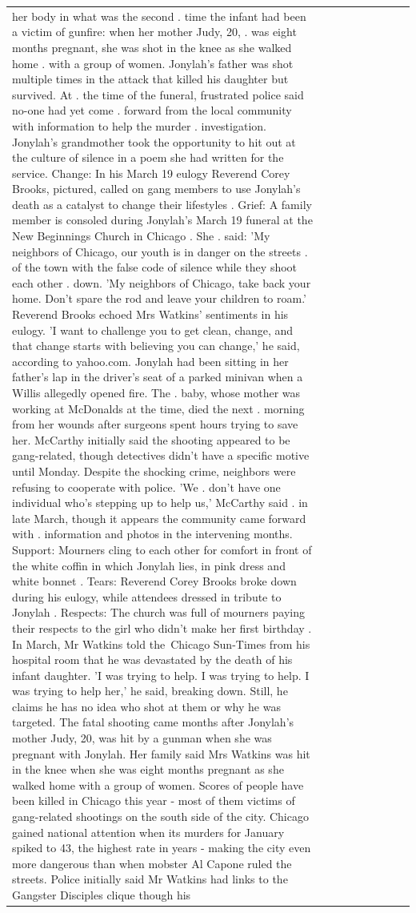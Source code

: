 \begin{table}[H]
\begin{tabular}{lllrlllll}
her body in what was the second . time the infant had been a victim of gunfire: when her mother Judy, 20, . was eight months pregnant, she was shot in the knee as she walked home . with a group of women. Jonylah's father was shot multiple times in the attack that killed his daughter but survived. At . the time of the funeral, frustrated police said no-one had yet come . forward from the local community with information to help the murder . investigation. Jonylah's grandmother took the opportunity to hit out at the culture of silence in a poem she had written for the service. Change: In his March 19 eulogy Reverend Corey Brooks, pictured, called on gang members to use Jonylah's death as a catalyst to change their lifestyles . Grief: A family member is consoled during Jonylah's March 19 funeral at the New Beginnings Church in Chicago . She . said: 'My neighbors of Chicago, our youth is in danger on the streets . of the town with the false code of silence while they shoot each other . down. 'My neighbors of Chicago, take back your home. Don't spare the rod and leave your children to roam.' Reverend Brooks echoed Mrs Watkins' sentiments in his eulogy. 'I want to challenge you to get clean, change, and that change starts with believing you can change,' he said, according to yahoo.com. Jonylah had been sitting in her father's lap in the driver's seat of a parked minivan when a Willis allegedly opened fire. The . baby, whose mother was working at McDonalds at the time, died the next . morning from her wounds after surgeons spent hours trying to save her. McCarthy initially said the shooting appeared to be gang-related, though detectives didn't have a specific motive until Monday. Despite the shocking crime, neighbors were refusing to cooperate with police. 'We . don't have one individual who's stepping up to help us,' McCarthy said . in late March, though it appears the community came forward with . information and photos in the intervening months. Support: Mourners cling to each other for comfort in front of the white coffin in which Jonylah lies, in pink dress and white bonnet . Tears: Reverend Corey Brooks broke down during his eulogy, while attendees dressed in tribute to Jonylah . Respects: The church was full of mourners paying their respects to the girl who didn't make her first birthday . In March, Mr Watkins told the Chicago Sun-Times from his hospital room that he was devastated by the death of his infant daughter. 'I was trying to help. I was trying to help. I was trying to help her,' he said, breaking down. Still, he claims he has no idea who shot at them or why he was targeted. The fatal shooting came months after Jonylah's mother Judy, 20, was hit by a gunman when she was pregnant with Jonylah. Her family said Mrs Watkins was hit in the knee when she was eight months pregnant as she walked home with a group of women. Scores of people have been killed in Chicago this year - most of them victims of gang-related shootings on the south side of the city. Chicago gained national attention when its murders for January spiked to 43, the highest rate in years - making the city even more dangerous than when mobster Al Capone ruled the streets. Police initially said Mr Watkins had links to the Gangster Disciples clique though his 
\end{tabular}
\end{table}
